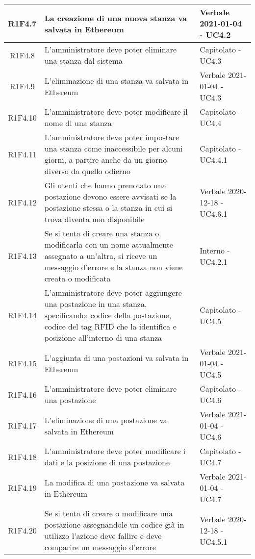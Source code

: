 \begin{center}
\begin{longtable}{|c|p{10cm}|p{4cm}|}
						\hline
				R1F4.7&	La creazione di una nuova stanza va salvata in Ethereum&Verbale 2021-01-04 - UC4.2 	\\
						\hline
				R1F4.8&L'amministratore deve poter eliminare una stanza dal sistema	& Capitolato - UC4.3	\\
						\hline
				R1F4.9&L'eliminazione di una stanza va salvata in Ethereum	& Verbale 2021-01-04 - UC4.3	\\
						\hline
				R1F4.10&L'amministratore deve poter modificare il nome di una stanza	& Capitolato - UC4.4	\\
						\hline
			R1F4.11&L'amministratore deve poter impostare una stanza come inaccessibile per alcuni giorni, a partire anche da un giorno diverso da quello odierno	& Capitolato - UC4.4.1	\\
					\hline
			R1F4.12&Gli utenti che hanno prenotato una postazione devono essere avvisati se la postazione stessa o la stanza in cui si trova diventa non disponibile	& Verbale 2020-12-18 - UC4.6.1	\\
					\hline
R1F4.13&Se si tenta di creare una stanza o modificarla con un nome attualmente assegnato a un'altra, si riceve un messaggio d'errore e la stanza non viene creata o modificata	& Interno - UC4.2.1	\\
						\hline
			R1F4.14&L'amministratore deve poter aggiungere una postazione in una stanza, specificando: codice della postazione, codice del tag RFID che la identifica e posizione all'interno di una stanza	& Capitolato - UC4.5	\\
					\hline
			R1F4.15&L'aggiunta di una postazioni va salvata in Ethereum	&Verbale 2021-01-04 - UC4.5 	\\
					\hline
R1F4.16&L'amministratore deve poter eliminare una postazione	& Capitolato - UC4.6	\\
						\hline
		R1F4.17	&L'eliminazione di una postazione va salvata in Ethereum	& Verbale 2021-01-04 - UC4.6	\\
					\hline
			R1F4.18&L'amministratore deve poter modificare i dati e la posizione di una postazione	& Capitolato - UC4.7	\\
					\hline
R1F4.19&	La modifica di una postazione va salvata in Ethereum& Verbale 2021-01-04 - UC4.7	\\
					\hline
R1F4.20&	Se si tenta di creare o modificare una postazione assegnandole un codice già in utilizzo l'azione deve fallire e deve comparire un messaggio d'errore& Verbale 2020-12-18 - UC4.5.1 	\\
						\hline

\end{longtable}
\end{center}
